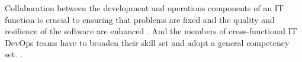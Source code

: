 Collaboration between the development and operations components of an IT function is crucial to ensuring that problems are fixed and the quality and resilience of the software are enhanced \cite{aw_2019}. And the members of cross-functional IT DevOps teams have to broaden their skill set and adopt a general competency set. \cite{aw_2019}.









